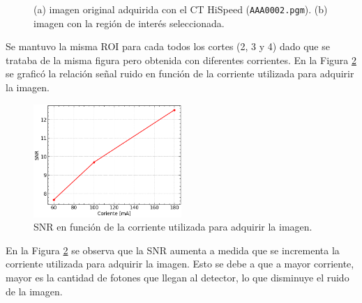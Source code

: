 \documentclass[11pt, twocolumn]{article}
\begin{document}
\begin{figure}[htbp]
  \centering
  \hfill
  \hfill
  \caption{(a) imagen original adquirida con el CT HiSpeed (\texttt{AAA0002.pgm}). (b) imagen con la región de interés seleccionada.}
  \label{fig:figuras_ej_7}
\end{figure}

Se mantuvo la misma ROI para cada todos los cortes (2, 3 y 4) dado que se trataba de la misma figura pero obtenida con diferentes corrientes. En la Figura \ref{fig:SNR_vs_I} se graficó la relación señal ruido en función de la corriente utilizada para adquirir la imagen.

\begin{figure} [htbp]
  \centering
  \includegraphics[width=0.5\textwidth]{images/ej_7/SNR_corriente.png}
  \caption{SNR en función de la corriente utilizada para adquirir la imagen.}
  \label{fig:SNR_vs_I}
\end{figure}

En la Figura \ref{fig:SNR_vs_I} se observa que la SNR aumenta a medida que se incrementa la corriente utilizada para adquirir la imagen. Esto se debe a que a mayor corriente, mayor es la cantidad de fotones que llegan al detector, lo que disminuye el ruido de la imagen.
\end{document}
